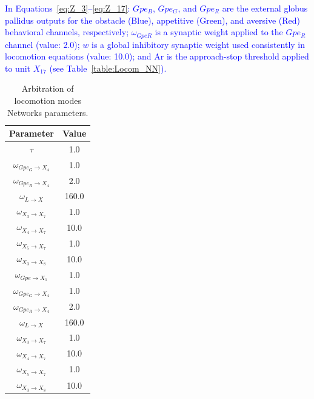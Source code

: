 \documentclass[preprint,12pt]{elsarticle}
\newcommand{\revblue}[1]{\textcolor{blue}{#1}}
\begin{document}
\revblue{In Equations~\eqref{eq:Z_3}–\eqref{eq:Z_17}: $Gpe_B$, $Gpe_G$, and $Gpe_R$ are the external globus pallidus outputs for the obstacle (Blue), appetitive (Green), and aversive (Red) behavioral channels, respectively; $\omega_{GpeR}$ is a synaptic weight applied to the $Gpe_R$ channel (value: 2.0); $w$ is a global inhibitory synaptic weight used consistently in locomotion equations (value: 10.0); and $\text{Ar}$ is the approach-stop threshold applied to unit $X_{17}$ (see Table~\ref{table:Locom_NN}).}

\begin{table}[t]
\centering
\caption{Arbitration of locomotion modes Networks parameters.}
\begin{tabular}{|c|c|}
\hline
\textbf{Parameter} & \textbf{Value} \\ \hline
$\tau$ & 1.0 \\ \hline

$\omega_{Gpe_G \rightarrow X_4}$ & 1.0 \\ \hline
$\omega_{Gpe_R \rightarrow X_4}$ & 2.0 \\ \hline

$\omega_{L \rightarrow X}$ & 160.0 \\ \hline

$\omega_{X_3 \rightarrow X_7}$ & 1.0 \\ \hline
$\omega_{X_4 \rightarrow X_7}$ & 10.0 \\ \hline
$\omega_{X_5 \rightarrow X_7}$ & 1.0 \\ \hline

$\omega_{X_3 \rightarrow X_8}$ & 10.0 \\ \hline
$\omega_{Gpe \rightarrow X_1}$ & 1.0 \\ \hline

$\omega_{Gpe_G \rightarrow X_4}$ & 1.0 \\ \hline
$\omega_{Gpe_R \rightarrow X_4}$ & 2.0 \\ \hline

$\omega_{L \rightarrow X}$ & 160.0 \\ \hline



$\omega_{X_3 \rightarrow X_7}$ & 1.0 \\ \hline
$\omega_{X_4 \rightarrow X_7}$ & 10.0 \\ \hline
$\omega_{X_5 \rightarrow X_7}$ & 1.0 \\ \hline

$\omega_{X_3 \rightarrow X_8}$ & 10.0 \\ \hline


\end{tabular}
\end{table}
\end{document}
